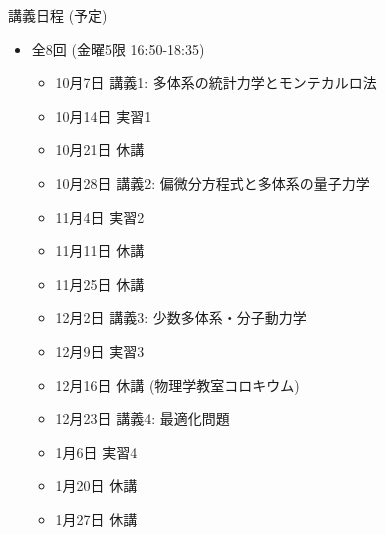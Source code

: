 \begin{frame}[t]{講義日程 (予定)}
  \begin{itemize}
  \item 全8回 (金曜5限 16:50-18:35)
    \begin{itemize}
    \item 10月7日 講義1: 多体系の統計力学とモンテカルロ法
    \item 10月14日 実習1
    \item {\color{gray} 10月21日 休講}
    \item 10月28日 講義2: 偏微分方程式と多体系の量子力学
    \item 11月4日 実習2
    \item {\color{gray} 11月11日 休講}
    \item {\color{gray} 11月25日 休講}
    \item 12月2日 講義3: 少数多体系・分子動力学
    \item 12月9日 実習3
    \item {\color{gray} 12月16日 休講 (物理学教室コロキウム)}
    \item 12月23日 講義4: 最適化問題
    \item 1月6日 実習4
    \item {\color{gray} 1月20日 休講}
    \item {\color{gray} 1月27日 休講}
    \end{itemize}
  \end{itemize}
\end{frame}
